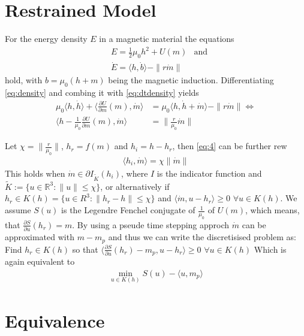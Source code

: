 \documentclass[a4paper,10pt]{article}
\begin{document}
\section{Restrained Model}

For the energy density $E$ in a magnetic material the equations
\begin{align}
    &E = \frac{1}{2} \mu_0 h^2 + U(m) & \text{and} \label{eq:density} \\
    &\dot E= \langle h, \dot b \rangle - \|r\dot m\| \label{eq:dtdensity}
\end{align}
hold, with $b = \mu_0(h + m)$ being the magnetic induction. Differentiating \eqref{eq:density} and combing it with \eqref{eq:dtdensity} yields
\begin{align}
    \mu_0 \langle h,\dot h \rangle + \langle \frac{\partial U}{\partial m}(m), \dot m \rangle &= \mu_0 \langle h,\dot h + \dot m \rangle - \|r \dot m\| \Leftrightarrow \\
    \langle h - \frac{1}{\mu_0} \frac{\partial U}{\partial m}(m), \dot m \rangle &= \|\frac{r}{\mu_0} \dot m \| \label{eq:4}
\end{align}





Let $\chi = \|\frac{r}{\mu_0}\|$, $h_r = f(m)$ and $h_i = h - h_r$, then \eqref{eq:4} can be further rew
\begin{align}
    \langle h_i, \dot m \rangle = \chi \|\dot m\|
\end{align}
This holds when $\dot m \in \partial I_{\tilde K}(h_i)$, where $I$ is the indicator
function and $\tilde K := \{u \in \mathbb R^3: \|u\| \leq \chi\}$,
or alternatively if $h_r \in K(h) = \{u \in R^3: \|h_r - h\| \leq \chi \}$ and $\langle \dot m, u - h_r \rangle \geq 0 \,\, \forall u \in K(h)$.
We assume $S(u)$ is the Legendre Fenchel conjugate of $\frac{1}{\mu_0}$ of $U(m)$,
which means, that $\frac{\partial S}{\partial u}(h_r) = m$. By using a pseude time stepping approch $\dot m$ can be approximated with $m - m_p$
and thus we can write the discretisised problem
as: Find $h_r \in K(h)$ so that $\langle \frac{\partial S}{\partial u}(h_r) - m_p,u - h_r \rangle \geq 0 \,\, \forall u \in K(h)$
Which is again equivalent to \begin{align}\min_{u \in K(h)} S(u) - \langle u, m_p \rangle \end{align}


\section{Equivalence}
\end{document}
